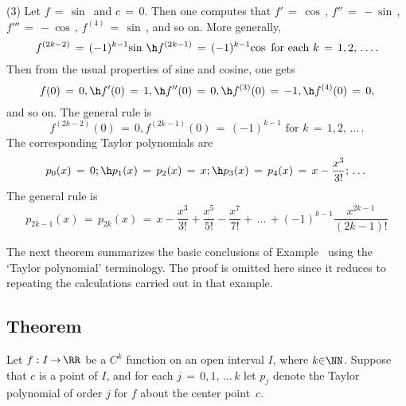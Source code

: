 {        (3) Let $f \,=\, {\sin}\,$ and $c \,=\, 0$.
    Then one computes that $f' \,=\, {\cos}\,$, $f'' \,=\, -{\sin}\,$, $f''' \,=\, -{\cos}\,$, $f^{(4)} \,=\, {\sin}\,$, and so on.
    More generally,
        \begin{displaymath}
        f^{(2k-2)} \,=\, (-1)^{k-1}{\sin}\,\, \h f^{(2k-1)} \,=\, (-1)^{k-1}{\cos}\, \mbox{ for each $k \,=\, 1,2,\,{\ldots}\,$}.
        \end{displaymath}
    Then from the usual properties of sine and cosine, one gets
        \begin{displaymath}
        f(0) \,=\, 0, \h f'(0) \,=\, 1, \h f''(0) \,=\, 0, \h f^{(3)}(0) \,=\, -1, \h f^{(4)}(0) \,=\, 0,
        \end{displaymath}
    and so on. The general rule is
        \begin{displaymath}
        f^{(2k-2)}(0) \,=\, 0, f^{(2k-1)}(0) \,=\, (-1)^{k-1} \mbox{ for $k \,=\, 1,2,\,{\ldots}\,$}.
        \end{displaymath}
    The corresponding Taylor polynomials are
        \begin{displaymath}
        p_{0}(x) \,=\, 0; \h p_{1}(x) \,=\, p_{2}(x) \,=\, x; \h p_{3}(x) \,=\, p_{4}(x) \,=\, x - \frac{x^{3}}{3!}; \,{\ldots}\,
        \end{displaymath}
    The general rule is
        \begin{displaymath}
        p_{2k-1}(x) \,=\, p_{2k}(x) \,=\, x - \frac{x^{3}}{3!} + \frac{x^{5}}{5!} - \frac{x^{7}}{7!} + \,{\ldots}\,+ (-1)^{k-1}\frac{x^{2k-1}}{(2k-1)!}
        \end{displaymath}

\VV

        The next theorem summarizes the basic conclusions of Example~ using the `Taylor polynomial' terminology.
    The proof is omitted here since it reduces to repeating the calculations carried out in that example.

\V

            \subsection{\small{\bf Theorem}}
            \label{ThmE60.35}
\V


        Let $f:I \,{\rightarrow}\, {\RR}$ be a $C^{k}$ function on an open interval $I$, where $k{\in}{\NN}$.
    Suppose that $c$ is a point of $I$, and for each $j \,=\, 0,1,\,{\ldots}\,k$ let $p_{j}$
    denote the Taylor polynomial of order $j$ for $f$ about the center point~$c$.

}
